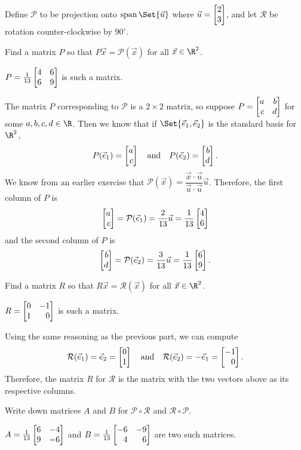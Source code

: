 \documentclass{problemset}
\begin{document}
	\label{projectionAndRotation}
	Define $\mathcal P$ to be projection onto $\Span\Set{\vec u}$ where $\vec u=\mat{2\\3}$,
	and let $\mathcal R$ be rotation counter-clockwise by $90^\circ$.
	\begin{parts}
		\item Find a matrix $P$ so that $P\vec x=\mathcal P(\vec x)$ for all $\vec x\in\R^2$.
			\begin{solution}
				$P = \frac{1}{13}\mat{4&6\\6&9}$ is such a matrix.

				The matrix $P$ corresponding to $\mathcal P$ is a $2\times 2$ matrix,
				so suppose $P=\mat{a&b\\c&d}$ for some $a,b,c,d\in\R$. Then we
				know that if $\Set{\xhat,\yhat}$ is the standard basis for $\R^2$,
				\[
					P(\xhat)=\mat{a\\c} \quad \text{and} \quad P(\yhat)=\mat{b\\d}.
				\]
				We know from an earlier exercise that
				$\mathcal P(\vec x)=\dfrac{\vec x\cdot\vec u}{\vec u\cdot\vec u}\vec u$.
				Therefore, the first column of $P$ is
				\[
					\mat{a\\c}=\mathcal P(\xhat)=\frac{2}{13}\vec u=\frac{1}{13}\mat{4\\6}
				\]
				and the second column of $P$ is
				\[
					\mat{b\\d}=\mathcal P(\yhat)=\frac{3}{13}\vec u=\frac{1}{13}\mat{6\\9}.
				\]
			\end{solution}
		\item Find a matrix $R$ so that $R\vec x=\mathcal R(\vec x)$ for all $\vec x\in\R^2$.
			\begin{solution}
				$R=\mat{0&-1\\1&0}$ is such a matrix.

				Using the same reasoning as the previous part, we can compute
				\[
					\mathcal R(\xhat)=\yhat=\mat{0\\1}
					\quad \text{and} \quad
					\mathcal R(\yhat)=-\xhat=\mat{-1\\0}.
				\]
				Therefore, the matrix $R$ for $\mathcal R$ is the matrix with the
				two vectors above as its respective columns.
			\end{solution}
		\item Write down matrices $A$ and $B$ for $\mathcal P\circ\mathcal R$
			and $\mathcal R\circ \mathcal P$.
			\begin{solution}
				$A=\frac{1}{13}\mat{6&-4\\9&-6}$ and $B=\frac{1}{13}\mat{-6&-9\\4&6}$
				are two such matrices.


\end{solution}
\end{parts}
\end{document}
